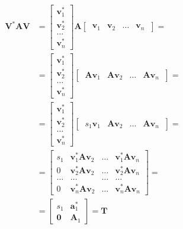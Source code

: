 \documentclass[letterpaper,10pt,english]{jupyterBook}
\begin{document}
\begin{equation*}
\begin{split}\begin{aligned}
  \mathbf{V}^* \mathbf{A} \mathbf{V}
  & = \begin{bmatrix} \mathbf{v}_1^* \\ \mathbf{v}_2^* \\ \dots \\ \mathbf{v}_n^* \end{bmatrix} \mathbf{A} \begin{bmatrix} \ \mathbf{v}_1 & \mathbf{v}_2 & \dots & \mathbf{v}_n \ \end{bmatrix} = \\
  & = \begin{bmatrix} \mathbf{v}_1^* \\ \mathbf{v}_2^* \\ \dots \\ \mathbf{v}_n^* \end{bmatrix} \begin{bmatrix} \ \mathbf{A} \mathbf{v}_1 & \mathbf{A} \mathbf{v}_2 & \dots & \mathbf{A} \mathbf{v}_n \ \end{bmatrix} = \\
  & = \begin{bmatrix} \mathbf{v}_1^* \\ \mathbf{v}_2^* \\ \dots \\ \mathbf{v}_n^* \end{bmatrix} \begin{bmatrix} \ s_1 \mathbf{v}_1 & \mathbf{A} \mathbf{v}_2 & \dots & \mathbf{A} \mathbf{v}_n \ \end{bmatrix} = \\
  & = \begin{bmatrix}
    s_1 & \mathbf{v}_1^* \mathbf{A} \mathbf{v}_2 & \dots & \mathbf{v}_1^* \mathbf{A} \mathbf{v}_n \\
      0 & \mathbf{v}_2^* \mathbf{A} \mathbf{v}_2 & \dots & \mathbf{v}_2^* \mathbf{A} \mathbf{v}_n \\
  \dots & \dots                                  & \dots & \dots                                  \\
      0 & \mathbf{v}_n^* \mathbf{A} \mathbf{v}_2 & \dots & \mathbf{v}_n^* \mathbf{A} \mathbf{v}_n
    \end{bmatrix} = \\
  & = \begin{bmatrix} s_1 & \mathbf{a}_1^* \\ \mathbf{0} & \mathbf{A}_1 \end{bmatrix} = \mathbf{T}
\end{aligned}\end{split}
\end{equation*}
\end{document}
